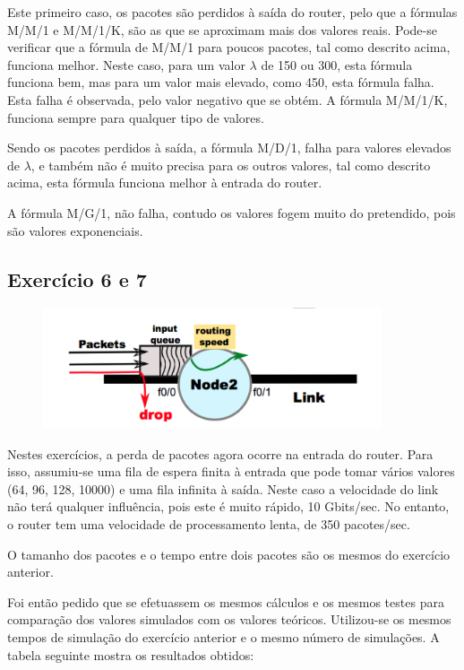 \documentclass[pdftex,12pt,a4paper]{report}
\begin{document}

Este primeiro caso, os pacotes são perdidos à saída do router, pelo que a fórmulas M/M/1 e M/M/1/K, são as que se aproximam mais dos valores reais. Pode-se verificar que a fórmula de M/M/1 para poucos pacotes, tal como descrito acima, funciona melhor. Neste caso, para um valor $\lambda$ de 150 ou 300, esta fórmula funciona bem, mas para um valor mais elevado, como 450, esta fórmula falha. Esta falha é observada, pelo valor negativo que se obtém. A fórmula M/M/1/K, funciona sempre para qualquer tipo de valores.

Sendo os pacotes perdidos à saída, a fórmula M/D/1, falha para valores elevados de $\lambda$, e também não é muito precisa para os outros valores, tal como descrito acima, esta fórmula funciona melhor à entrada do router.

A fórmula M/G/1, não falha, contudo os valores fogem muito do pretendido, pois são valores exponenciais.

\newpage
\subsection{Exercício 6 e 7}

\begin{figure}[!htb]
\center
 \includegraphics[width=100mm,scale=1]{imagensGuia/ex6.png}
 \label{fig:ex6}
\end{figure}

Nestes exercícios, a perda de pacotes agora ocorre na entrada do router. Para isso, assumiu-se uma fila de espera finita à entrada que pode tomar vários valores (64, 96, 128, 10000) e uma fila infinita à saída. Neste caso a velocidade do link não terá qualquer influência, pois este é muito rápido, 10 Gbits/sec. No entanto, o router tem uma velocidade de processamento lenta, de 350 pacotes/sec.

O tamanho dos pacotes e o tempo entre dois pacotes são os mesmos do exercício anterior.

Foi então pedido que se efetuassem os mesmos cálculos e os mesmos testes para comparação dos valores simulados com os valores teóricos. Utilizou-se os mesmos tempos de simulação do exercício anterior e o mesmo número de simulações. A tabela seguinte mostra os resultados obtidos: 
\end{document}
